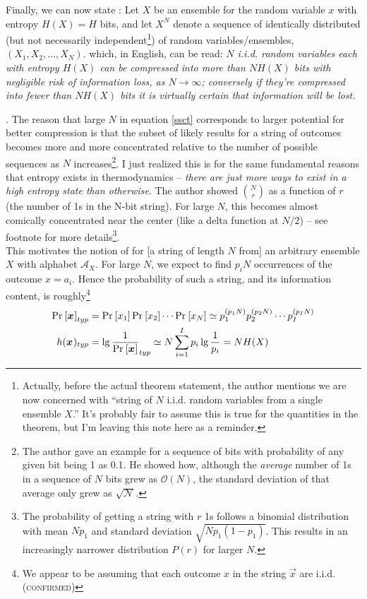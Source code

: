 \documentclass[11pt]{article}
\begin{document}
Finally, we can now state : Let $X$ be an ensemble for the random variable $x$ with entropy $H(X) = H$ bits, and let $X^N$ denote a sequence of identically distributed (but not necessarily independent\footnote{Actually, before the actual theorem statement, the author mentions we are now concerned with ``string of $N$ i.i.d. random variables from a single ensemble $X$.'' It's probably fair to assume this is true for the quantities in the theorem, but I'm leaving this note here as a reminder.}) of random variables/ensembles, $(X_1, X_2, \ldots, X_N)$. 
which, in English, can be read: \textit{$N$ i.i.d. random variables each with entropy $H(X)$ can be compressed into more than $NH(X)$ bits with negligible risk of information loss, as $N \rightarrow \infty$; conversely if they're compressed into fewer than $NH(X)$ bits it is virtually certain that information will be lost.}

\myspace
\p {}. The reason that large $N$ in equation \ref{ssct} corresponds to larger potential for better compression is that the subset of likely results for a string of outcomes becomes more and more concentrated relative to the number of possible sequences as $N$ increases\footnote{The author gave an example for a sequence of bits with probability of any given bit being 1 as 0.1. He showed how, although the \textit{average} number of 1s in a sequence of $N$ bits grew as $\mathcal{O}(N)$, the standard deviation of that average only grew as $\mathcal{\sqrt{N}}$.}. I just realized this is for the same fundamental reasons that entropy exists in thermodynamics -- \textit{there are just more ways to exist in a high entropy state than otherwise}. The author showed $\binom{N}{r}$ as a function of $r$ (the number of 1s in the N-bit string). For large $N$, this becomes almost comically concentrated near the center (like a delta function at $N/2$) -- see footnote for more details\footnote{The probability of getting a string with $r$ 1s follows a binomial distribution with mean $Np_1$ and standard deviation $\sqrt{Np_1(1-p_1)}$. This results in an increasingly narrower distribution $P(r)$ for larger $N$.}. \\

\p This motivates the notion of  for [a string of length $N$ from] an arbitrary ensemble $X$ with alphabet $\mathcal{A}_X$. For large $N$, we expect to find $p_i N$ occurrences of the outcome $x = a_i$. Hence the probability of such a string, and its information content, is roughly\footnote{We appear to be assuming that each outcome $x$ in the string $\vec x$ are i.i.d. (\textsc{confirmed})}
\begin{align}
	\text{Pr}_{}\left[\bm{x}_{}\right]_{typ} &= \text{Pr}_{}\left[x_1\right] \text{Pr}_{}\left[x_2\right] \cdots \text{Pr}_{}\left[x_N\right] \simeq p_1^{(p_1N)} p_2^{(p_2 N)} \cdots p_I^{(p_I N)} \\
	h(\bm{x}_{})_{typ} &= \lg \frac{1}{\text{Pr}_{}\left[\bm{x}_{}\right]}_{typ} \simeq N \sum_{i = 1}^I p_i \lg \frac{1}{p_i}  = NH(X)
\end{align} 
\end{document}
